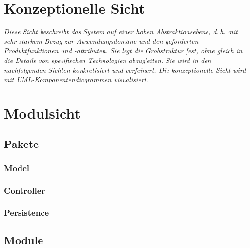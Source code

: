\documentclass[enabledeprecatedfontcommands,fontsize=12pt,paper=a4,twoside]{scrartcl}
\begin{document}
\section{Konzeptionelle Sicht}
\label{sec:konzeptionell}

{\it Diese Sicht beschreibt das System auf einer hohen Abstraktionsebene,
d.\,h. mit sehr starkem Bezug zur Anwendungsdomäne und den geforderten
Produktfunktionen und \linebreak-attributen. Sie legt die Grobstruktur fest,
ohne gleich in die Details von spezifischen Technologien abzugleiten.
Sie wird in den nachfolgenden Sichten konkretisiert und verfeinert. Die
konzeptionelle Sicht wird mit {UML}-Komponentendiagrammen visualisiert.}

\section{Modulsicht}
\label{sec:modulsicht}

\subsection{Pakete}

\subsubsection{Model}

\subsubsection{Controller}

\subsubsection{Persistence}

\subsection{Module}
\end{document}
